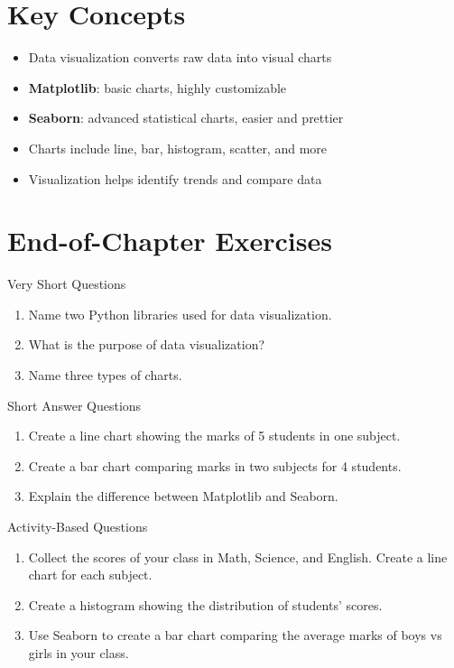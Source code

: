 \section{Key Concepts}

\begin{itemize}
    \item Data visualization converts raw data into visual charts  
    \item \textbf{Matplotlib}: basic charts, highly customizable  
    \item \textbf{Seaborn}: advanced statistical charts, easier and prettier  
    \item Charts include line, bar, histogram, scatter, and more  
    \item Visualization helps identify trends and compare data  
\end{itemize}

\section{End-of-Chapter Exercises}

\begin{exercise}{Very Short Questions}
\begin{enumerate}
    \item Name two Python libraries used for data visualization.  
    \item What is the purpose of data visualization?  
    \item Name three types of charts.  
\end{enumerate}
\end{exercise}

\begin{exercise}{Short Answer Questions}
\begin{enumerate}
    \item Create a line chart showing the marks of 5 students in one subject.  
    \item Create a bar chart comparing marks in two subjects for 4 students.  
    \item Explain the difference between Matplotlib and Seaborn.  
\end{enumerate}
\end{exercise}

\begin{exercise}{Activity-Based Questions}
\begin{enumerate}
    \item Collect the scores of your class in Math, Science, and English. Create a line chart for each subject.  
    \item Create a histogram showing the distribution of students’ scores.  
    \item Use Seaborn to create a bar chart comparing the average marks of boys vs girls in your class.  
\end{enumerate}
\end{exercise}


